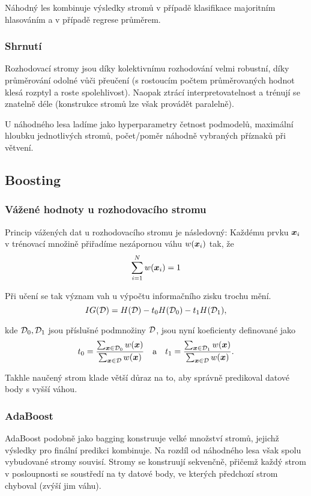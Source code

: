 \documentclass[../main.tex]{subfiles}
\begin{document}
Náhodný les kombinuje výsledky stromů v případě klasifikace majoritním hlasováním a v případě regrese průměrem.

\subsubsection{Shrnutí}

Rozhodovací stromy jsou díky kolektivnímu rozhodování velmi robustní, díky průměrování odolné vůči přeučení (s rostoucím počtem průměrovaných hodnot klesá rozptyl a roste spolehlivost). Naopak ztrácí interpretovatelnost a trénují se znatelně déle (konstrukce stromů lze však provádět paralelně).

U náhodného lesa ladíme jako hyperparametry četnost podmodelů, maximální hloubku jednotlivých stromů, počet/poměr náhodně vybraných příznaků při větvení.

\subsection{Boosting}

\subsubsection{Vážené hodnoty u rozhodovacího stromu}

Princip vážených dat u rozhodovacího stromu je následovný: Každému prvku $\bm{x}_i$ v trénovací množině přiřadíme nezápornou váhu $w(\bm{x}_i)$ tak, že \[\sum_{i=1}^{N} w(\bm{x}_i) = 1\]

Při učení se tak význam vah u výpočtu informačního zisku trochu mění.
\[
    IG(\mathcal{D}) = H(\mathcal{D}) - t_0 H(\mathcal{D}_0) - t_1 H(\mathcal{D}_1),
\]

kde $\mathcal{D}_0, \mathcal{D}_1$ jsou příslušné podmnožiny $\mathcal{D}$, jsou nyní koeficienty definované jako
\begin{equation*}
    t_0 = \frac{\sum_{\bm{x} \in \mathcal{D}_0} w(\bm{x})}{\sum_{\bm{x} \in \mathcal{D}} w(\bm{x})}
    \quad \text{a} \quad
    t_1 = \frac{\sum_{\bm{x} \in \mathcal{D}_1} w(\bm{x})}{\sum_{\bm{x} \in \mathcal{D}} w(\bm{x})}.
\end{equation*}

Takhle naučený strom klade větší důraz na to, aby správně predikoval datové body s vyšší váhou.

\subsubsection{AdaBoost}

AdaBoost podobně jako bagging konstruuje velké množství stromů, jejichž výsledky pro finální predikci kombinuje. Na rozdíl od náhodného lesa však spolu vybudované stromy souvisí. Stromy se konstruují sekvenčně, přičemž každý strom v posloupnosti se soustředí na ty datové body, ve kterých předchozí strom chyboval (zvýší jim váhu).
\end{document}
